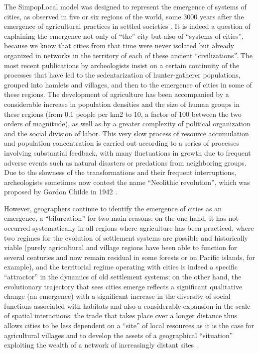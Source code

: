 \documentclass[10pt]{article}
\begin{document}
The SimpopLocal model was designed to represent the emergence of systems of cities, as observed in five or six regions of the world, some 3000 years after the emergence of agricultural practices in settled societies \citep{bairoch1985jericho,marcus2008ancient}. It is indeed a question of explaining the emergence not only of ``the'' city but also of ``systems of cities'', because we know that cities from that time were never isolated but already organized in networks in the territory of each of these ancient ``civilizations''. The most recent publications by archeologists insist on a certain continuity of the processes that have led to the sedentarization of hunter-gatherer populations, grouped into hamlets and villages, and then to the emergence of cities in some of these regions. The development of agriculture has been accompanied by a considerable increase in population densities and the size of human groups in these regions (from 0.1 people per km2 to 10, a factor of 100 between the two orders of magnitude), as well as by a greater complexity of political organization and the social division of labor. This very slow process of resource accumulation and population concentration is carried out according to a series of processes involving substantial feedback, with many fluctuations in growth due to frequent adverse events such as natural disasters or predations from neighboring groups. Due to the slowness of the transformations and their frequent interruptions, archeologists sometimes now contest the name ``Neolithic revolution'', which was proposed by Gordon Childe in 1942 \citep[p. 159]{demoule2018histoire}.

However, geographers continue to identify the emergence of cities as an emergence, a ``bifurcation'' for two main reasons: on the one hand, it has not occurred systematically in all regions where agriculture has been practiced, where two regimes for the evolution of settlement systems are possible and historically viable (purely agricultural and village regions have been able to function for several centuries and now remain residual in some forests or on Pacific islands, for example), and the territorial regime operating with cities is indeed a specific ``attractor'' in the dynamics of old settlement systems; on the other hand, the evolutionary trajectory that sees cities emerge reflects a significant qualitative change (an emergence) with a significant increase in the diversity of social functions associated with habitats and also a considerable expansion in the scale of spatial interactions: the trade that takes place over a longer distance thus allows cities to be less dependent on a “site” of local resources as it is the case for agricultural villages and to develop the assets of a geographical ``situation'' exploiting the wealth of a network of increasingly distant sites \citep{reymond1971pour}.
\end{document}
